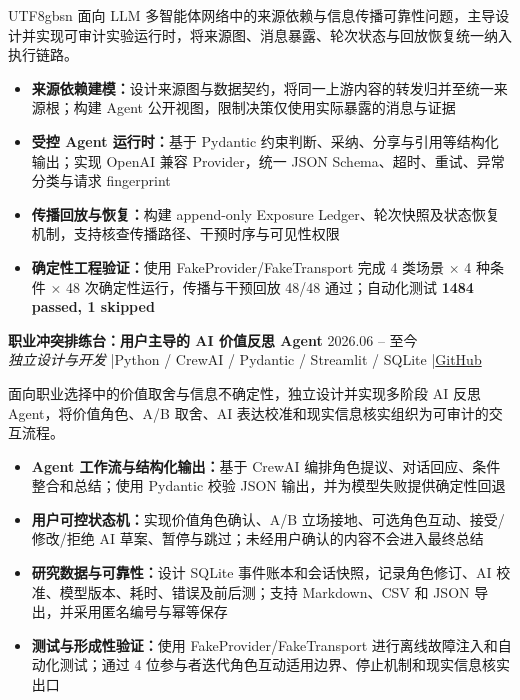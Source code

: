 \documentclass[11pt,a4paper]{article}
\begin{document}
\begin{CJK}{UTF8}{gbsn}
面向 LLM 多智能体网络中的来源依赖与信息传播可靠性问题，主导设计并实现可审计实验运行时，将来源图、消息暴露、轮次状态与回放恢复统一纳入执行链路。
\begin{itemize}
\item \textbf{来源依赖建模：}设计来源图与数据契约，将同一上游内容的转发归并至统一来源根；构建 Agent 公开视图，限制决策仅使用实际暴露的消息与证据
\item \textbf{受控 Agent 运行时：}基于 Pydantic 约束判断、采纳、分享与引用等结构化输出；实现 OpenAI 兼容 Provider，统一 JSON Schema、超时、重试、异常分类与请求 fingerprint
\item \textbf{传播回放与恢复：}构建 append-only Exposure Ledger、轮次快照及状态恢复机制，支持核查传播路径、干预时序与可见性权限
\item \textbf{确定性工程验证：}使用 FakeProvider/FakeTransport 完成 4 类场景 $\times$ 4 种条件 $\times$ 48 次确定性运行，传播与干预回放 48/48 通过；自动化测试 \textbf{1484 passed, 1 skipped}
\end{itemize}
\vspace{3pt}
\textbf{职业冲突排练台：用户主导的 AI 价值反思 Agent} \hfill 2026.06 -- 至今 \\
\textit{独立设计与开发} \enspace|\enspace Python / CrewAI / Pydantic / Streamlit / SQLite \enspace|\enspace \href{https://github.com/Bobozane/career-value-stage}{GitHub}

\vspace{1pt}
面向职业选择中的价值取舍与信息不确定性，独立设计并实现多阶段 AI 反思 Agent，将价值角色、A/B 取舍、AI 表达校准和现实信息核实组织为可审计的交互流程。
\begin{itemize}
\item \textbf{Agent 工作流与结构化输出：}基于 CrewAI 编排角色提议、对话回应、条件整合和总结；使用 Pydantic 校验 JSON 输出，并为模型失败提供确定性回退
\item \textbf{用户可控状态机：}实现价值角色确认、A/B 立场接地、可选角色互动、接受/修改/拒绝 AI 草案、暂停与跳过；未经用户确认的内容不会进入最终总结
\item \textbf{研究数据与可靠性：}设计 SQLite 事件账本和会话快照，记录角色修订、AI 校准、模型版本、耗时、错误及前后测；支持 Markdown、CSV 和 JSON 导出，并采用匿名编号与幂等保存
\item \textbf{测试与形成性验证：}使用 FakeProvider/FakeTransport 进行离线故障注入和自动化测试；通过 4 位参与者迭代角色互动适用边界、停止机制和现实信息核实出口
\end{itemize}

\end{CJK}
\end{document}
